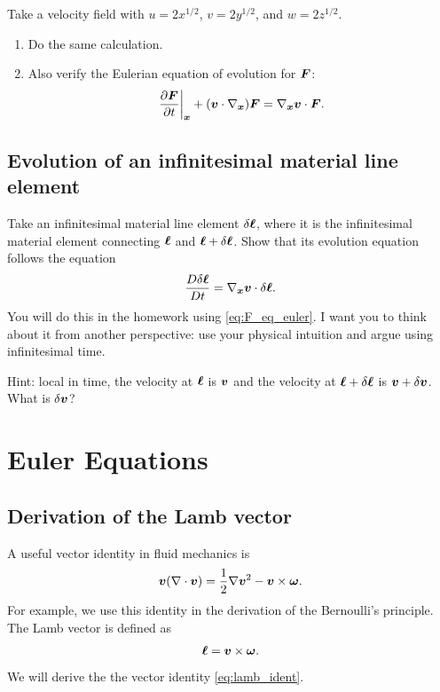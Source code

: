 \documentclass[11pt,letterpaper]{report}
\begin{document}
\subsection{}
Take a velocity field with $u=2x^{1/2}$, $v=2y^{1/2}$, and $w=2z^{1/2}$. 
\begin{enumerate}
    \item Do the same calculation.
    \item Also verify the Eulerian equation of evolution for $\boldsymbol{F}$:
        \begin{align}
            \left.\frac{\partial\boldsymbol{F}}{\partial t}\right|_{\boldsymbol{x}}+(\boldsymbol{v}\cdot\nabla_{\boldsymbol{x}})\boldsymbol{F} = \nabla_{\boldsymbol{x}}\boldsymbol{v}\cdot \boldsymbol{F}.\label{eq:F_eq_euler}
        \end{align}
\end{enumerate}

\section{Evolution of an infinitesimal material line element}
Take an infinitesimal material line element $\delta\boldsymbol{\ell}$, where it is the
infinitesimal material element connecting $\boldsymbol{\ell}$ and $\boldsymbol{\ell}+\delta\boldsymbol{\ell}$. Show that its evolution equation follows the equation
\begin{align}
    \frac{D\delta\boldsymbol{\ell}}{Dt}=\nabla_{\boldsymbol{x}}\boldsymbol{v}\cdot \delta\boldsymbol{\ell}.
\end{align}
You will do this in the homework using \eqref{eq:F_eq_euler}. I want you to think about it from another perspective: use your physical intuition and argue using infinitesimal time. 

Hint: local in time, the velocity at $\boldsymbol{\ell}$ is $\boldsymbol{v}$ and the velocity at $\boldsymbol{\ell}+\delta\boldsymbol{\ell}$ is $\boldsymbol{v}+\delta\boldsymbol{v}$. What is $\delta\boldsymbol{v}$?

\chapter{Euler Equations}
\section{Derivation of the Lamb vector}
A useful vector identity in fluid mechanics is
\begin{align}
    \boldsymbol{v}(\nabla\cdot\boldsymbol{v}) = \frac{1}{2}\nabla\boldsymbol{v}^2-\boldsymbol{v}\times\boldsymbol{\omega}.\label{eq:lamb_ident}
\end{align}
For example, we use this identity in the derivation of the Bernoulli's principle. The Lamb vector is defined as
\begin{align}
    \boldsymbol{\ell} = \boldsymbol{v}\times\boldsymbol{\omega}.
\end{align}
We will derive the the vector identity \eqref{eq:lamb_ident}.
\end{document}
